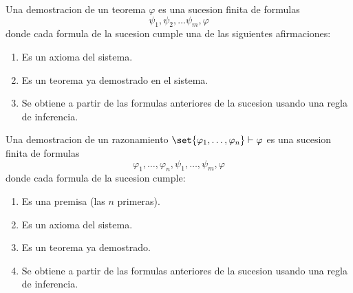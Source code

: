 \begin{definition}
	Una demostracion de un teorema \(\varphi\) es una sucesion finita de formulas
	\[
		\psi_1, \psi_2, \ldots \psi_m, \varphi
	\]
	donde cada formula de la sucesion cumple una de las siguientes afirmaciones: \begin{enumerate}
		\item Es un axioma del sistema.
		\item Es un teorema ya demostrado en el sistema.
		\item Se obtiene a partir de las formulas anteriores de la sucesion usando una regla de inferencia.
	\end{enumerate}
\end{definition}
\begin{definition}
	Una demostracion de un razonamiento \(\set{\varphi_1, \ldots, \varphi_n } \vdash \varphi\) es una sucesion finita de formulas
	\[
		\varphi_1, \ldots, \varphi_n, \psi_1, \ldots, \psi_m, \varphi
	\]
	donde cada formula de la sucesion cumple:
	\begin{enumerate}
		\item Es una premisa (las \(n\) primeras).
		\item Es un axioma del sistema.
		\item Es un teorema ya demostrado.
		\item Se obtiene a partir de las formulas anteriores de la sucesion usando una regla de inferencia.
	\end{enumerate}
\end{definition}

